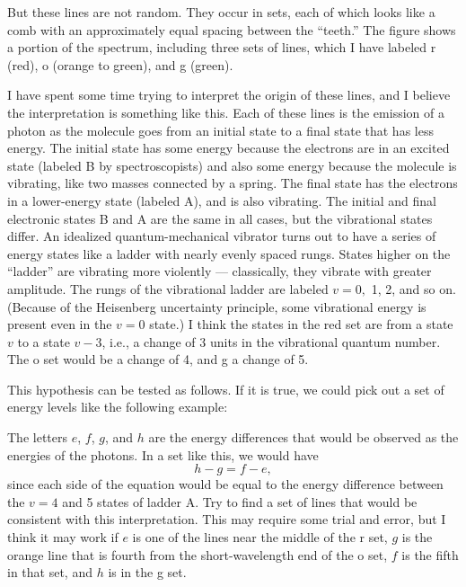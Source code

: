 
But these lines are not random. They occur in sets, each of which looks like
a comb with an approximately equal spacing between the ``teeth.'' The figure
shows a portion of the spectrum, including three sets of lines, which I have
labeled r (red), o (orange to green), and g (green).

I have spent some time
trying to interpret the origin of these lines, and I believe the interpretation
is something like this. Each of these lines is the emission of a photon as
the molecule goes from an initial state to a final state that has less energy.
The initial state has some energy because the electrons are in an excited state
(labeled B by spectroscopists) and also some energy because the molecule is vibrating,
like two masses connected by a spring. The final state has the electrons in
a lower-energy state (labeled A), and is also vibrating. The initial and final
electronic states B and A are the same in all cases, but the vibrational states
differ. An idealized quantum-mechanical vibrator turns out to have a series of
energy states like a ladder with nearly evenly spaced rungs. States higher on
the ``ladder'' are vibrating more violently --- classically, they vibrate with
greater amplitude. The rungs of the vibrational ladder are labeled $v=0,$ 1, 2, and so on.
(Because of the Heisenberg uncertainty principle, some vibrational energy is present
even in the $v=0$ state.) I think the states in the red set are from a state $v$ to
a state $v-3$, i.e., a change of 3 units in the vibrational quantum number. The o
set would be a change of 4, and g a change of 5.

This hypothesis can be tested as follows. If it is true, we could pick out a set of
energy levels like the following example:


The letters $e$, $f$, $g$, and $h$ are the energy differences that would be observed
as the energies of the photons. In a set like this, we would have
\begin{equation*}
  h-g = f-e,
\end{equation*}
since each side of the equation would be equal to the energy difference between the
$v=4$ and 5 states of ladder A. Try to find a set of lines that
would be consistent with this interpretation. This may require some trial and
error, but I think it may work if $e$ is one of the lines near the middle of the
r set, $g$ is the orange line that is fourth from the short-wavelength end
of the o set, $f$ is the fifth in that set, and $h$ is in the g set.

